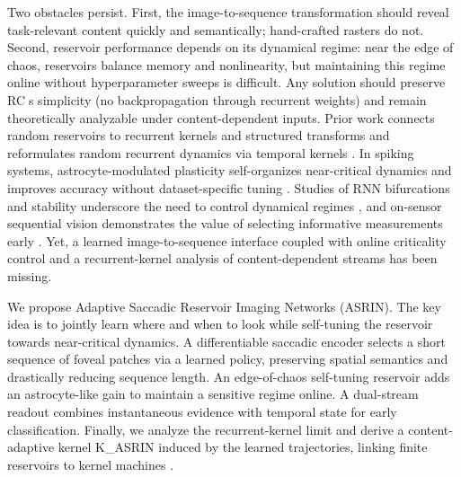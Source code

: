 \documentclass{article}
\begin{document}
Two obstacles persist. First, the image-to-sequence transformation should reveal task-relevant content quickly and semantically; hand-crafted rasters do not. Second, reservoir performance depends on its dynamical regime: near the edge of chaos, reservoirs balance memory and nonlinearity, but maintaining this regime online without hyperparameter sweeps is difficult. Any solution should preserve RCs simplicity (no backpropagation through recurrent weights) and remain theoretically analyzable under content-dependent inputs. Prior work connects random reservoirs to recurrent kernels and structured transforms \cite{dong-2020-reservoir} and reformulates random recurrent dynamics via temporal kernels \cite{nestler-2020-unfolding}. In spiking systems, astrocyte-modulated plasticity self-organizes near-critical dynamics and improves accuracy without dataset-specific tuning \cite{ivanov-2021-increasing}. Studies of RNN bifurcations and stability underscore the need to control dynamical regimes \cite{eisenmann-2023-bifurcations}, and on-sensor sequential vision demonstrates the value of selecting informative measurements early \cite{so-2023-pixelrnn}. Yet, a learned image-to-sequence interface coupled with online criticality control and a recurrent-kernel analysis of content-dependent streams has been missing.

We propose Adaptive Saccadic Reservoir Imaging Networks (ASRIN). The key idea is to jointly learn where and when to look while self-tuning the reservoir towards near-critical dynamics. A differentiable saccadic encoder selects a short sequence of foveal patches via a learned policy, preserving spatial semantics and drastically reducing sequence length. An edge-of-chaos self-tuning reservoir adds an astrocyte-like gain to maintain a sensitive regime online. A dual-stream readout combines instantaneous evidence with temporal state for early classification. Finally, we analyze the recurrent-kernel limit and derive a content-adaptive kernel K\_ASRIN induced by the learned trajectories, linking finite reservoirs to kernel machines \cite{dong-2020-reservoir,nestler-2020-unfolding}.
\end{document}
